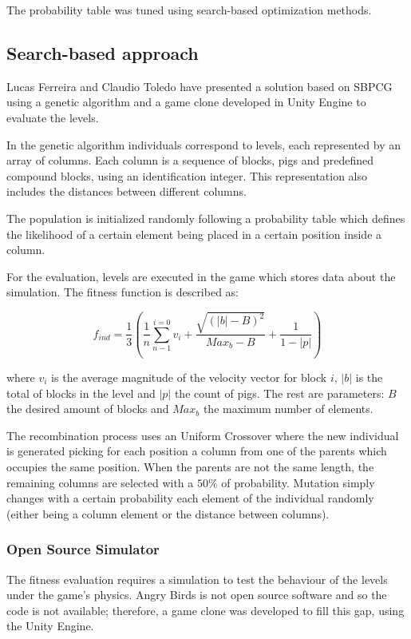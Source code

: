 The probability table was tuned using search-based optimization methods.

\subsection{Search-based approach}

Lucas Ferreira and Claudio Toledo\cite{ferreira2014search} have
presented a solution based on SBPCG using a genetic algorithm and a
game clone developed in Unity Engine to evaluate the levels. 

In the genetic algorithm individuals correspond to levels, each represented by an array of columns. Each column is a sequence of blocks, pigs and predefined compound blocks, using an identification integer. This representation also includes the distances between different columns.

The population is initialized randomly following a probability table which defines the likelihood of a certain element being placed in a certain position inside a column.

For the evaluation, levels are executed in the game which stores data about the simulation. The fitness function is described as:

$$ f_{ind} = \frac{1}{3}(\frac{1}{n} \sum_{n-1}^{i=0}{v_i}+\frac{\sqrt{(|b|-B)^2}}{Max_b-B}+ \frac{1}{1-|p|})$$ 

where $v_i$ is the average magnitude of the velocity vector for block $i$, $|b|$ is the total of blocks in the level and $|p|$ the count of pigs. The rest are parameters: $B$ the desired amount of blocks and $Max_b$ the maximum number of elements.

The recombination process uses an Uniform Crossover where the new individual is generated picking for each position a column from one of the parents which occupies the same position. When the parents are not the same length, the remaining columns are selected with a $50\%$ of probability. Mutation simply changes with a certain probability each element of the individual randomly (either being a column element or the distance between columns).

\subsubsection{Open Source Simulator}

The fitness evaluation requires a simulation to test the behaviour of the levels under the game's physics. Angry Birds is not open source software and so the code is not available; therefore, a game clone was developed to fill this gap, using the Unity Engine.

